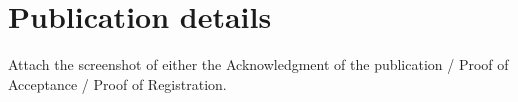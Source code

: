 \chapter{Publication details}

Attach the screenshot of either the Acknowledgment of the publication / Proof of Acceptance / Proof of Registration.  